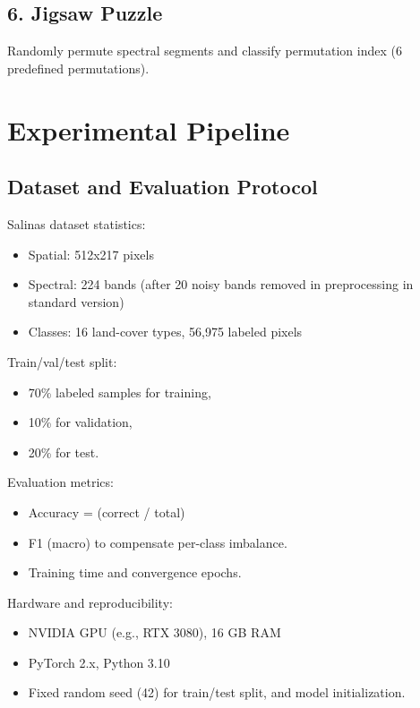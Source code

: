 \documentclass[11pt,a4paper]{article}
\begin{document}
\subsection{6. Jigsaw Puzzle}
Randomly permute spectral segments and classify permutation index (6 predefined permutations).

\section{Experimental Pipeline}

\subsection{Dataset and Evaluation Protocol}

Salinas dataset statistics:
\begin{itemize}
    \item Spatial: 512x217 pixels
    \item Spectral: 224 bands (after 20 noisy bands removed in preprocessing in standard version)
    \item Classes: 16 land-cover types, 56,975 labeled pixels
\end{itemize}

Train/val/test split:
\begin{itemize}
    \item 70\% labeled samples for training,
    \item 10\% for validation,
    \item 20\% for test.
\end{itemize}

Evaluation metrics:
\begin{itemize}
    \item Accuracy = (correct / total)
    \item F1 (macro) to compensate per-class imbalance.
    \item Training time and convergence epochs.
\end{itemize}

Hardware and reproducibility:
\begin{itemize}
    \item NVIDIA GPU (e.g., RTX 3080), 16 GB RAM
    \item PyTorch 2.x, Python 3.10
    \item Fixed random seed (42) for train/test split, and model initialization.
\end{itemize}
\end{document}
